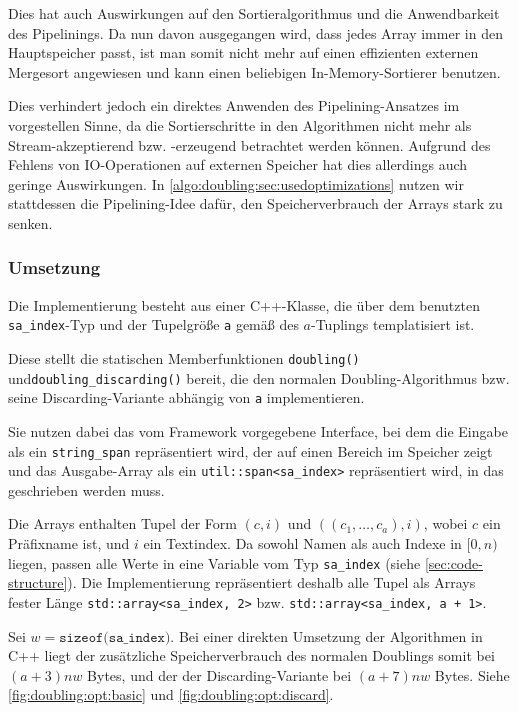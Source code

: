 Dies hat auch Auswirkungen auf den Sortieralgorithmus und die Anwendbarkeit des Pipelinings. Da nun davon ausgegangen wird, dass jedes Array immer in den Hauptspeicher passt, ist man somit nicht mehr auf einen effizienten externen Mergesort angewiesen und kann einen beliebigen In-Memory-Sortierer benutzen. 

Dies verhindert jedoch ein direktes Anwenden des Pipelining-Ansatzes im vorgestellen Sinne, da die Sortierschritte in den Algorithmen nicht mehr als Stream-akzeptierend bzw. -erzeugend betrachtet werden können. Aufgrund des Fehlens von IO-Operationen auf externen Speicher hat dies allerdings auch geringe Auswirkungen. In \cref{algo:doubling:sec:usedoptimizations} nutzen wir stattdessen die Pipelining-Idee dafür, den Speicherverbrauch der Arrays stark zu senken.

\subsubsection{Umsetzung}

Die Implementierung besteht aus einer C++-Klasse, die über dem benutzten \texttt{sa\_index}-Typ und der Tupelgröße \texttt{a} gemäß des $a$-Tuplings templatisiert ist.

Diese stellt die statischen Memberfunktionen \texttt{doubling()} und\linebreak \texttt{doubling\_discarding()} bereit, die den normalen Doubling-Algorithmus bzw. seine Discarding-Variante abhängig von \texttt{a} implementieren.

Sie nutzen dabei das vom Framework vorgegebene Interface, bei dem die Eingabe als ein \texttt{string\_span} repräsentiert wird, der auf einen Bereich im Speicher zeigt und das Ausgabe-Array \sa als ein \texttt{util::span<sa\_index>} repräsentiert wird, in das geschrieben werden muss.

Die Arrays enthalten Tupel der Form  $(c, i)$ und $((c_1, \dots, c_a), i)$, wobei $c$ ein Präfixname ist, und $i$ ein Textindex. Da sowohl Namen als auch Indexe in $[0, n)$ liegen, passen alle Werte in eine Variable vom Typ \texttt{sa\_index} (siehe \cref{sec:code-structure}). Die Implementierung repräsentiert deshalb alle Tupel als Arrays fester Länge \texttt{std::array<sa\_index, 2>} bzw. \texttt{std::array<sa\_index, a + 1>}.

Sei $w = \texttt{sizeof(sa\_index)}$. Bei einer direkten Umsetzung der Algorithmen in C++ liegt der zusätzliche Speicherverbrauch des normalen Doublings somit bei $(a + 3)nw$ Bytes, und der der Discarding-Variante bei $(a + 7)nw$ Bytes. Siehe \cref{fig:doubling:opt:basic} und \cref{fig:doubling:opt:discard}.

